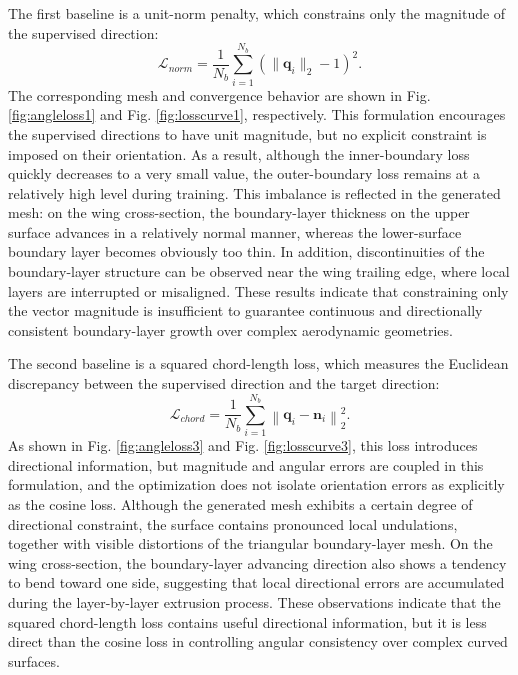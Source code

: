 \documentclass[%
 aip,
 amsmath,amssymb,
 reprint,%
nobibnotes,
]{revtex4-1}
\begin{document}
The first baseline is a unit-norm penalty, which constrains only the magnitude of the supervised direction:
\begin{equation}
    \mathcal{L}_{norm}
    =
    \frac{1}{N_b}
    \sum_{i=1}^{N_b}
    \left(
    \|\mathbf{q}_i\|_2-1
    \right)^2 .
\end{equation}
The corresponding mesh and convergence behavior are shown in Fig. \ref{fig:angleloss1} and Fig. \ref{fig:losscurve1}, respectively. This formulation encourages the supervised directions to have unit magnitude, but no explicit constraint is imposed on their orientation. As a result, although the inner-boundary loss quickly decreases to a very small value, the outer-boundary loss remains at a relatively high level during training. This imbalance is reflected in the generated mesh: on the wing cross-section, the boundary-layer thickness on the upper surface advances in a relatively normal manner, whereas the lower-surface boundary layer becomes obviously too thin. In addition, discontinuities of the boundary-layer structure can be observed near the wing trailing edge, where local layers are interrupted or misaligned.
These results indicate that constraining only the vector magnitude is insufficient to guarantee continuous and directionally consistent boundary-layer growth over complex aerodynamic geometries.

The second baseline is a squared chord-length loss, which measures the Euclidean discrepancy between the supervised direction and the target direction:
\begin{equation}
    \mathcal{L}_{chord}
    =
    \frac{1}{N_b}
    \sum_{i=1}^{N_b}
    \left\|
    \mathbf{q}_i-\mathbf{n}_i
    \right\|_2^2 .
\end{equation}
As shown in Fig. \ref{fig:angleloss3} and Fig. \ref{fig:losscurve3}, this loss introduces directional information, but magnitude and angular errors are coupled in this formulation, and the optimization does not isolate orientation errors as explicitly as the cosine loss. Although the generated mesh exhibits a certain degree of directional constraint, the surface contains pronounced local undulations, together with visible distortions of the triangular boundary-layer mesh. On the wing cross-section, the boundary-layer advancing direction also shows a tendency to bend toward one side, suggesting that local directional errors are accumulated during the layer-by-layer extrusion process. These observations indicate that the squared chord-length loss contains useful directional information, but it is less direct than the cosine loss in controlling angular consistency over complex curved surfaces.
\end{document}

